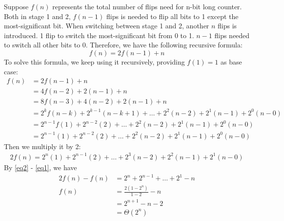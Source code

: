 \documentclass[11pt]{article}
\begin{document}
Suppose $f(n)$ represents the total number of flips need for n-bit long counter. Both in stage 1 and 2, $f(n-1)$ flips is needed to flip all bits to 1 except the most-significant bit. When switching between stage 1 and 2, another $n$ flips is introduced. 1 flip to switch the most-significant bit from 0 to 1. $n-1$ flips needed to switch all other bits to 0. Therefore, we have the following recursive formula:
\[
	f(n) = 2f(n-1) + n
\]
To solve this formula, we keep using it recursively, providing $f(1) = 1$ as base case:
 \begin{align}
 	f(n) 	&= 2f(n-1) + n \nonumber \\
		&= 4f(n-2) + 2(n-1) + n \nonumber \\
		&= 8f(n-3) + 4(n-2) + 2(n-1) + n \nonumber \\
		&= 2^kf(n-k) + 2^{k-1}(n-k+1) + \ldots + 2^2(n-2) + 2^1(n-1) + 2^0(n-0) \nonumber \\
		&= 2^{n-1}f(1) + 2^{n-2}(2) + \ldots + 2^2(n-2) + 2^1(n-1) + 2^0(n-0) \nonumber  \\
		&= 2^{n-1}(1) + 2^{n-2}(2) + \ldots + 2^2(n-2) + 2^1(n-1) + 2^0(n-0) \label{eq1} 
 \end{align}
Then we multiply it by 2:
 \begin{align}
	2f(n) =  2^{n}(1) + 2^{n-1}(2) + \ldots + 2^3(n-2) + 2^2(n-1) + 2^1(n-0) \label{eq2}  
 \end{align}
By \eqref{eq2} - \eqref{eq1}, we have
 \begin{align*}
 	2f(n) - f(n) &= 2^n + 2^{n-1} + \ldots + 2^1 -n \\
	f(n)		&= \frac{2(1-2^n)}{1-2} - n \\
			&= 2^{n+1} - n - 2 \\
			&= \Theta(2^n)
  \end{align*}
\end{document}
